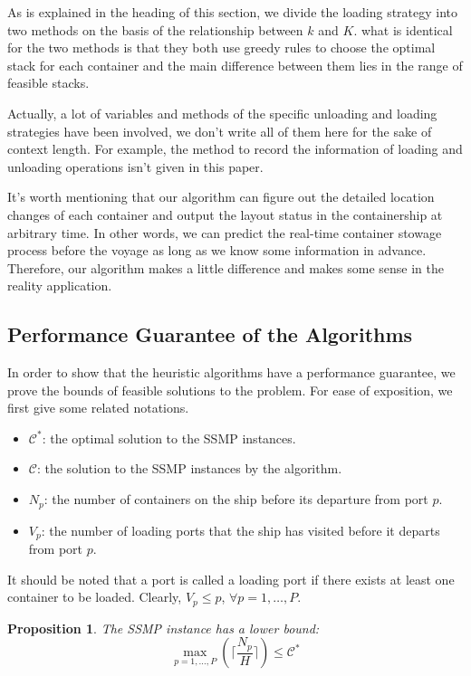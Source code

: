 \documentclass[review,3p,times,authoryear,12pt]{elsarticle}
\newtheorem{proposition}{Proposition}
\begin{document}
As is explained in the heading of this section, we divide the loading strategy into two methods on the basis of the relationship between $k$ and $K$.
what is identical for the two methods is that they both use greedy rules to choose the optimal stack for each container and the main difference between them lies in the range of feasible stacks.

Actually, a lot of variables and methods of the specific unloading and loading strategies have been involved, we don't write all of them here for the sake of context length.
For example, the method to record the information of loading and unloading operations isn't given in this paper.

It's worth mentioning that our algorithm can figure out the detailed location changes of each container and output the layout status in the containership at arbitrary time.
In other words, we can predict the real-time container stowage process before the voyage as long as we know some information in advance.
Therefore, our algorithm makes a little difference and makes some sense in the reality application.


\subsection{Performance Guarantee of the Algorithms}
\label{sec:p3}

In order to show that the heuristic algorithms have a performance guarantee, we prove the bounds of feasible solutions to the problem.
For ease of exposition, we first give some related notations.

\begin{itemize}
\item $\mathcal{C}^*$: the optimal solution to the SSMP instances.
\item $\mathcal{C}$: the solution to the SSMP instances by the algorithm.
\item $N_p$: the number of containers on the ship before its departure from port $p$.
\item $V_p$: the number of loading ports that the ship has visited before it departs from port $p$.
\end{itemize}

It should be noted that a port is called a loading port if there exists at least one container to be loaded. Clearly, $V_p \le p$, $\forall p=1,\ldots,P$.

\begin{proposition}
The SSMP instance has a lower bound:
\begin{equation*}
\max\limits_{p=1,\ldots,P}(\lceil\frac{N_p}{H}\rceil) \le \mathcal C^*
\end{equation*}
\label{pro:a1}
\end{proposition}
\end{document}
